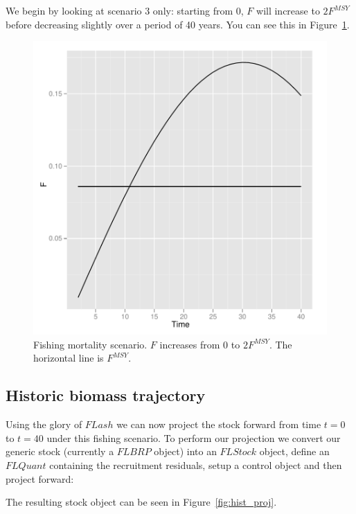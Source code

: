 \documentclass[a4paper]{article}
\begin{document}
We begin by looking at scenario 3 only: starting from 0, $F$ will increase to $2F^{MSY}$
before decreasing slightly over a period of 40 years. You can see this in Figure~\ref{fig:Fscenario}. 

\begin{figure}
\centering
\includegraphics{script-F_plot1}
\caption{Fishing mortality scenario. $F$ increases from 0 to $2F^{MSY}$. The horizontal line is $F^{MSY}$.}
\label{fig:Fscenario}
\end{figure}

\subsection{Historic biomass trajectory}

Using the glory of $FLash$ we can now project the stock forward from time $t=0$ to $t=40$ under this fishing
scenario. To perform our projection we convert our generic stock (currently a $FLBRP$ object) into an $FLStock$ object,
define an $FLQuant$ containing the recruitment residuals, setup a control object and then project forward:


The resulting stock object can be seen in Figure~\ref{fig:hist_proj}.
\end{document}
